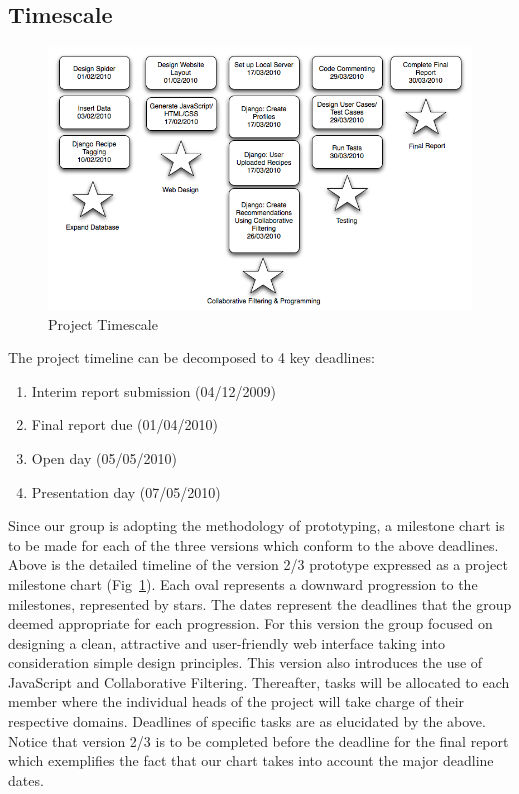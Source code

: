 \subsection{Timescale}

\begin{figure}[h]
\includegraphics[width=1.1\textwidth]{milestone}
\caption{Project Timescale}
\label{fig:milestone}
\end{figure}

The project timeline can be decomposed to 4 key deadlines:
\begin{enumerate}
	\item Interim report submission (04/12/2009)
	\item Final report due (01/04/2010)
	\item Open day (05/05/2010)
	\item Presentation day (07/05/2010)

\end{enumerate}

Since our group is adopting the methodology of prototyping, a milestone chart is to be made for each of the three versions which conform to the above deadlines. Above is the detailed timeline of the version 2/3 prototype expressed as a project milestone chart (Fig~\ref{fig:milestone}). 
Each oval represents a downward progression to the milestones, represented by stars. The dates represent the deadlines that the group deemed appropriate for each progression.
For this version the group focused on designing a clean, attractive and user-friendly web interface taking into consideration simple design principles. This version also introduces the use of JavaScript and Collaborative Filtering.  Thereafter, tasks will be allocated to each member where the individual heads of the project will take charge of their respective domains. Deadlines of specific tasks are as elucidated by the above. Notice that version 2/3 is to be completed before the deadline for the final report which exemplifies the fact that our chart takes into account the major deadline dates.

\newpage

 
